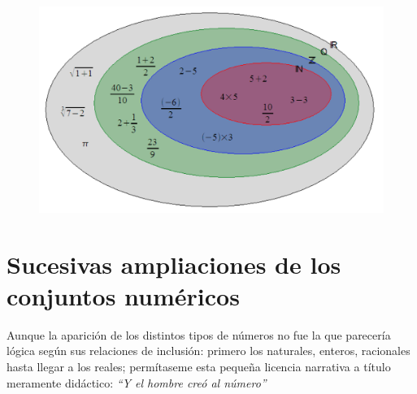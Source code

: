 \begin{figure}[H]
	\centering
	\includegraphics[width=.7\textwidth]{img-reales/reales00.png}	
\end{figure}


\section{Sucesivas ampliaciones de los conjuntos numéricos}
\vspace{1cm}


Aunque la aparición de los distintos tipos de números no fue la que parecería lógica según sus relaciones de inclusión: primero los naturales, enteros, racionales hasta llegar a los reales;  permítaseme esta pequeña licencia narrativa a título meramente didáctico: \emph{``Y el hombre creó al número''}


\newpage %

$\qquad$ %

